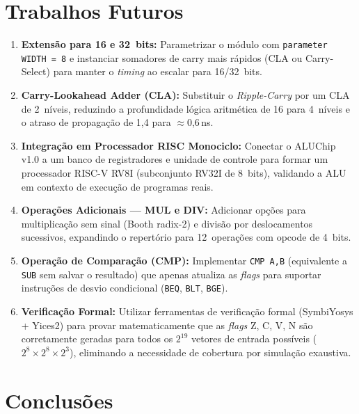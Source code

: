\documentclass[12pt,a4paper]{article}
\begin{document}
\section{Trabalhos Futuros}

\begin{enumerate}[leftmargin=2em,label=\textbf{TF\arabic*.}]
  \item \textbf{Extensão para 16 e 32~bits:} Parametrizar o módulo com \texttt{parameter WIDTH = 8} e instanciar somadores de carry mais rápidos (CLA ou Carry-Select) para manter o \textit{timing} ao escalar para 16/32~bits.

  \item \textbf{Carry-Lookahead Adder (CLA):} Substituir o \textit{Ripple-Carry} por um CLA de 2~níveis, reduzindo a profundidade lógica aritmética de 16 para 4~níveis e o atraso de propagação de 1,4 para $\approx$0,6\,ns.

  \item \textbf{Integração em Processador RISC Monociclo:} Conectar o ALUChip v1.0 a um banco de registradores e unidade de controle para formar um processador RISC-V RV8I (subconjunto RV32I de 8~bits), validando a ALU em contexto de execução de programas reais.

  \item \textbf{Operações Adicionais --- MUL e DIV:} Adicionar opções para multiplicação sem sinal (Booth radix-2) e divisão por deslocamentos sucessivos, expandindo o repertório para 12~operações com opcode de 4~bits.

  \item \textbf{Operação de Comparação (CMP):} Implementar \texttt{CMP A,B} (equivalente a \texttt{SUB} sem salvar o resultado) que apenas atualiza as \textit{flags} para suportar instruções de desvio condicional (\texttt{BEQ}, \texttt{BLT}, \texttt{BGE}).

  \item \textbf{Verificação Formal:} Utilizar ferramentas de verificação formal (SymbiYosys + Yices2) para provar matematicamente que as \textit{flags} Z, C, V, N são corretamente geradas para todos os $2^{19}$ vetores de entrada possíveis ($2^8 \times 2^8 \times 2^3$), eliminando a necessidade de cobertura por simulação exaustiva.
\end{enumerate}

\section{Conclusões}
\end{document}
